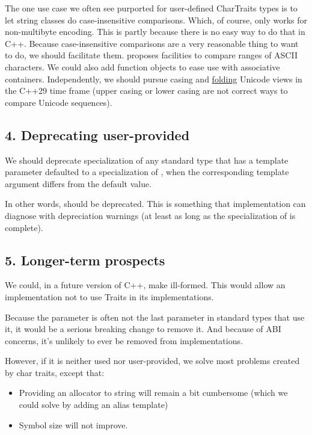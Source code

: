 \documentclass{wg21}
\begin{document}
The one use case we often see purported for user-defined CharTraits types is to let string classes do case-insensitive comparisons.
Which, of course, only works for non-multibyte encoding.
This is partly because there is no easy way to do that in C++.
Because case-insensitive comparisons are a very reasonable thing to want to do, we should facilitate them.  proposes facilities
to compare ranges of ASCII characters. We could also add function objects to ease use with associative containers.
Independently, we should pursue casing and \href{https://www.w3.org/TR/charmod-norm/#definitionCaseFolding}{folding} Unicode views in the C++29 time frame (upper casing or lower casing are not correct ways to compare Unicode sequences).

\subsection{4. Deprecating user-provided }

We should deprecate specialization of any standard type that has a template parameter defaulted to a specialization of ,
when the corresponding template argument differs from the default value.

In other words,  should be deprecated.
This is something that implementation can diagnose with depreciation warnings (at least as long as the specialization of  is complete).

\subsection{5. Longer-term prospects}

We could, in a future version of C++, make  ill-formed.
This would allow an implementation not to use Traits in its implementations.

Because the  parameter is often not the last parameter in standard types that use it, it would be a serious breaking change to remove it.
And because of ABI concerns, it's unlikely to ever be removed from implementations.

However, if it is neither used nor user-provided, we solve most problems created by char traits, except that:
\begin{itemize}
\item Providing an allocator to string will remain a bit cumbersome (which we could solve by adding an alias template)
\item Symbol size will not improve.
\end{itemize}
\end{document}
